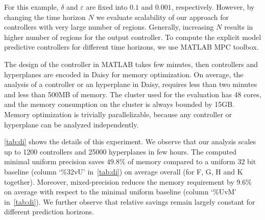 For this example, $\delta$ and $\varepsilon$ are fixed into $0.1$ and $0.001$, respectively. However, by changing the time horizon $N$ we evaluate scalability of our approach for controllers with very large number of regions. Generally, increasing $N$ results in higher number of regions for the output controller. To compute the explicit model predictive controllers for different time horizons, we use MATLAB MPC toolbox.%
 

The design of the controller in MATLAB takes few minutes, then controllers and
hyperplanes are encoded in Daisy for memory optimization. On average, the
analysis of a controller or an hyperplane in Daisy, requires less than two
minutes and less than 500MB of memory. The cluster used for the evaluation has
48 cores, and the memory consumption on the cluster is always bounded by
15GB. Memory optimization is trivially parallelizable, because any controller or
hyperplane can be analyzed independently.


\autoref{tab:di} shows the details of this experiment.
We observe that our analysis scales up to 1200 controllers and 25000 hyperplanes in few
hours.  The computed minimal uniform precision saves $49.8\%$ of memory
compared to a uniform $32$ bit baseline (column `\%32vU' in~\autoref{tab:di}) on
average overall (for F, G, H and K together). Moreover, mixed-precision reduces the memory
requirement by $9.6\%$ on average with respect to the minimal uniform baseline
(column `\%UvM' in~\autoref{tab:di}). 
We further observe that relative savings remain largely constant for different 
prediction horizons.
